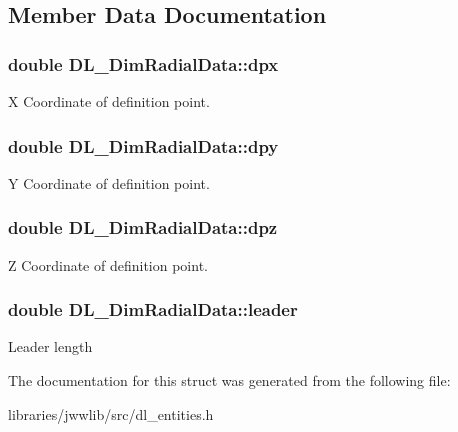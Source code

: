 \subsection{Member Data Documentation}
\hypertarget{structDL__DimRadialData_a8f838fb8c7303b580a2cfc9281f02f4a}{
\subsubsection[{dpx}]{\setlength{\rightskip}{0pt plus 5cm}double D\-L\-\_\-\-Dim\-Radial\-Data\-::dpx}}\label{structDL__DimRadialData_a8f838fb8c7303b580a2cfc9281f02f4a}
X Coordinate of definition point. \hypertarget{structDL__DimRadialData_aa9a7686fc3ba14c386c4480edee8ee03}{
\subsubsection[{dpy}]{\setlength{\rightskip}{0pt plus 5cm}double D\-L\-\_\-\-Dim\-Radial\-Data\-::dpy}}\label{structDL__DimRadialData_aa9a7686fc3ba14c386c4480edee8ee03}
Y Coordinate of definition point. \hypertarget{structDL__DimRadialData_aee0c285529533ff67c2f92953e7a52f2}{
\subsubsection[{dpz}]{\setlength{\rightskip}{0pt plus 5cm}double D\-L\-\_\-\-Dim\-Radial\-Data\-::dpz}}\label{structDL__DimRadialData_aee0c285529533ff67c2f92953e7a52f2}
Z Coordinate of definition point. \hypertarget{structDL__DimRadialData_a35c2c6ea123381cd28e4eb2496c6c6cf}{
\subsubsection[{leader}]{\setlength{\rightskip}{0pt plus 5cm}double D\-L\-\_\-\-Dim\-Radial\-Data\-::leader}}\label{structDL__DimRadialData_a35c2c6ea123381cd28e4eb2496c6c6cf}
Leader length 

The documentation for this struct was generated from the following file\-:\begin{DoxyCompactItemize}
\item 
libraries/jwwlib/src/dl\-\_\-entities.\-h\end{DoxyCompactItemize}

